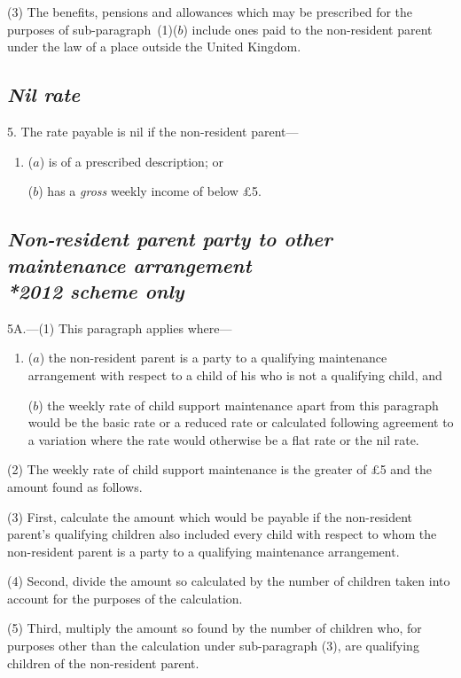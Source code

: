 \documentclass[12pt,a4paper]{article}
\begin{document}
(3) The benefits, pensions and allowances which may be prescribed for the purposes of sub-paragraph~(1)($b$)  include ones paid to the non-resident parent under the law of a place outside the United Kingdom.

\subsection*{\itshape Nil rate}

5. The rate payable is nil if the non-resident parent—
\begin{enumerate}\item[]
($a$) is of a prescribed description; or

($b$) has a 
\emph{gross}  %
weekly income of below £5. 
\end{enumerate}

\subsection*{\itshape Non-resident parent party to other maintenance arrangement\\*\emph{2012 scheme only}}

5A.---(1) This paragraph applies where—
\begin{enumerate}\item[]
($a$) the non-resident parent is a party to a qualifying maintenance arrangement with respect to a child of his who is not a qualifying child, and

($b$) the weekly rate of child support maintenance apart from this paragraph would be the basic rate or a reduced rate or calculated following agreement to a variation where the rate would otherwise be a flat rate or the nil rate.
\end{enumerate}

(2) The weekly rate of child support maintenance is the greater of 
£5  %
and the amount found as follows.

(3) First, calculate the amount which would be payable if the non-resident parent's qualifying children also included every child with respect to whom the non-resident parent is a party to a qualifying maintenance arrangement.

(4) Second, divide the amount so calculated by the number of children taken into account for the purposes of the calculation.

(5) Third, multiply the amount so found by the number of children who, for purposes other than the calculation under sub-\hspace{0pt}paragraph (3), are qualifying children of the non-resident parent.
\end{document}
